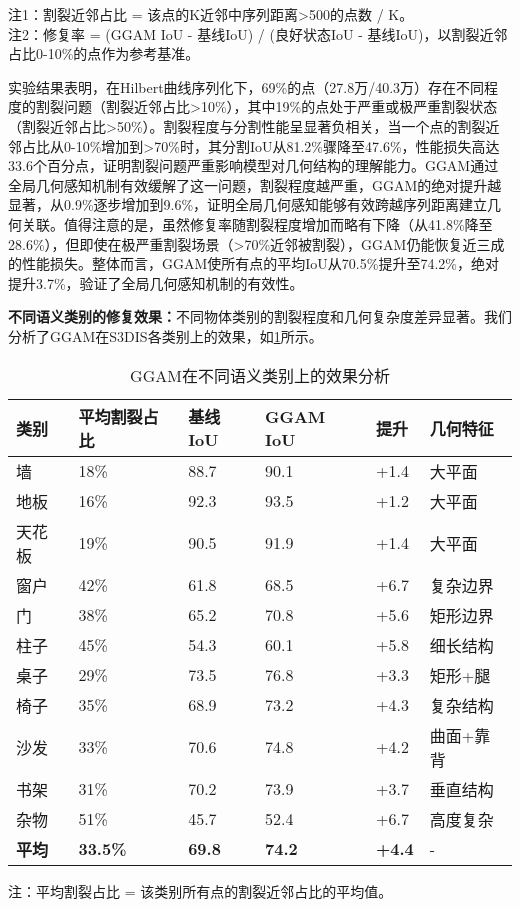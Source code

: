 \documentclass[preprint,12pt]{elsarticle}
\begin{document}
注1：割裂近邻占比 = 该点的K近邻中序列距离>500的点数 / K。\\
注2：修复率 = (GGAM IoU - 基线IoU) / (良好状态IoU - 基线IoU)，以割裂近邻占比0-10\%的点作为参考基准。

实验结果表明，在Hilbert曲线序列化下，69\%的点（27.8万/40.3万）存在不同程度的割裂问题（割裂近邻占比>10\%），其中19\%的点处于严重或极严重割裂状态（割裂近邻占比>50\%）。割裂程度与分割性能呈显著负相关，当一个点的割裂近邻占比从0-10\%增加到>70\%时，其分割IoU从81.2\%骤降至47.6\%，性能损失高达33.6个百分点，证明割裂问题严重影响模型对几何结构的理解能力。GGAM通过全局几何感知机制有效缓解了这一问题，割裂程度越严重，GGAM的绝对提升越显著，从0.9\%逐步增加到9.6\%，证明全局几何感知能够有效跨越序列距离建立几何关联。值得注意的是，虽然修复率随割裂程度增加而略有下降（从41.8\%降至28.6\%），但即使在极严重割裂场景（>70\%近邻被割裂），GGAM仍能恢复近三成的性能损失。整体而言，GGAM使所有点的平均IoU从70.5\%提升至74.2\%，绝对提升3.7\%，验证了全局几何感知机制的有效性。



\textbf{不同语义类别的修复效果：}不同物体类别的割裂程度和几何复杂度差异显著。我们分析了GGAM在S3DIS各类别上的效果，如\cref{tab:ggam_per_class}所示。

\begin{table}[htbp!]
	\centering
	\caption{GGAM在不同语义类别上的效果分析}
	\label{tab:ggam_per_class}
	\begin{tabular}{@{}llllll@{}}
		\toprule
		类别 & 平均割裂占比 & 基线IoU & GGAM IoU & 提升 & 几何特征 \\ 
		\midrule
		墙 & 18\% & 88.7 & 90.1 & +1.4 & 大平面 \\
		地板 & 16\% & 92.3 & 93.5 & +1.2 & 大平面 \\
		天花板 & 19\% & 90.5 & 91.9 & +1.4 & 大平面 \\
		\midrule
		窗户 & 42\% & 61.8 & 68.5 & +6.7 & 复杂边界 \\
		门 & 38\% & 65.2 & 70.8 & +5.6 & 矩形边界 \\
		柱子 & 45\% & 54.3 & 60.1 & +5.8 & 细长结构 \\
		\midrule
		桌子 & 29\% & 73.5 & 76.8 & +3.3 & 矩形+腿 \\
		椅子 & 35\% & 68.9 & 73.2 & +4.3 & 复杂结构 \\
		沙发 & 33\% & 70.6 & 74.8 & +4.2 & 曲面+靠背 \\
		书架 & 31\% & 70.2 & 73.9 & +3.7 & 垂直结构 \\
		杂物 & 51\% & 45.7 & 52.4 & +6.7 & 高度复杂 \\
		\midrule
		\textbf{平均} & \textbf{33.5\%} & \textbf{69.8} & \textbf{74.2} & \textbf{+4.4} & - \\
		\bottomrule
	\end{tabular}
\end{table}
注：平均割裂占比 = 该类别所有点的割裂近邻占比的平均值。
\end{document}
